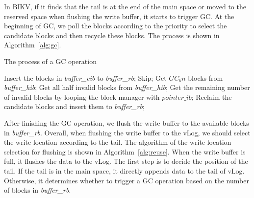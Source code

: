 \documentclass[sigconf]{acmart}
\begin{document}
In BIKV, if it finds that the tail is at the end of the main space or moved to the reserved space when flushing the write buffer, it starts to trigger GC. At the beginning of GC, we poll the blocks according to the priority to select the candidate blocks and then recycle these blocks. The process is shown in Algorithm~\ref{alg:gc}.
\begin{algorithm}[htbp]
	\caption{The process of a GC operation}
		\begin{algorithmic}[1]
			\STATE Insert the blocks in \textit{buffer\_eib} to \textit{buffer\_rb}; 
			\ENDIF
			\STATE Skip;
			\ELSE
			\STATE Get $GC_bn$ blocks from \textit{buffer\_hib};
			\ELSE
			\STATE Get all half invalid blocks from \textit{buffer\_hib};  
			\STATE Get the remaining number of invalid blocks by looping the block manager with $pointer\_ib$;
			\ENDIF
			\ENDIF
			\STATE Reclaim the candidate blocks and insert them to \textit{buffer\_rb};
			\ENDIF
		\end{algorithmic}
	\label{alg:gc}
\end{algorithm}

After finishing the GC operation, we flush the write buffer to the available blocks in \textit{buffer\_rb}. Overall, when flushing the write buffer to the vLog, we should select the write location according to the tail. The algorithm of the write location selection for flushing is shown in Algorithm~\ref{alg:reuse}. When the write buffer is full, it flushes the data to the vLog. The first step is to decide the position of the tail. If the tail is in the main space, it directly appends data to the tail of vLog. Otherwise, it determines whether to trigger a GC operation based on the number of blocks in \textit{buffer\_rb}. 
\end{document}
